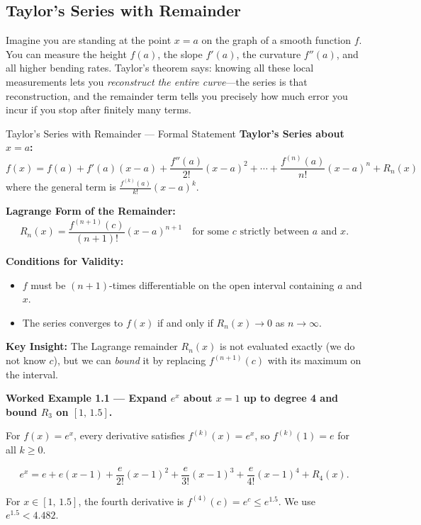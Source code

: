 \documentclass[12pt,a4paper]{article}
\begin{document}
\subsection{Taylor's Series with Remainder}

Imagine you are standing at the point \(x = a\) on the graph of a smooth function \(f\).
You can measure the height \(f(a)\), the slope \(f'(a)\), the curvature \(f''(a)\), and
all higher bending rates.
Taylor's theorem says: knowing all these local measurements lets you \emph{reconstruct the
entire curve}---the series is that reconstruction, and the remainder term tells you precisely
how much error you incur if you stop after finitely many terms.

\begin{infobox}{Taylor's Series with Remainder --- Formal Statement}
\textbf{Taylor's Series about \(x = a\):}
\[
  f(x) = f(a) + f'(a)(x-a) + \frac{f''(a)}{2!}(x-a)^2 + \cdots
         + \frac{f^{(n)}(a)}{n!}(x-a)^n + R_n(x)
\]
where the general term is \(\displaystyle\frac{f^{(k)}(a)}{k!}(x-a)^k\).

\medskip
\textbf{Lagrange Form of the Remainder:}
\[
  R_n(x) = \frac{f^{(n+1)}(c)}{(n+1)!}(x-a)^{n+1}
  \quad \text{for some } c \text{ strictly between } a \text{ and } x.
\]

\medskip
\textbf{Conditions for Validity:}
\begin{itemize}[leftmargin=1.5em]
  \item \(f\) must be \((n+1)\)-times differentiable on the open interval containing \(a\) and \(x\).
  \item The series converges to \(f(x)\) if and only if \(R_n(x) \to 0\) as \(n \to \infty\).
\end{itemize}

\medskip
\textbf{Key Insight:} The Lagrange remainder \(R_n(x)\) is not evaluated exactly (we do not know
\(c\)), but we can \emph{bound} it by replacing \(f^{(n+1)}(c)\) with its maximum on the interval.
\end{infobox}

\textbf{Worked Example 1.1 --- Expand \(e^x\) about \(x=1\) up to degree 4 and bound \(R_3\) on
\([1,\,1.5]\).}

\medskip
For \(f(x) = e^x\), every derivative satisfies \(f^{(k)}(x) = e^x\), so
\(f^{(k)}(1) = e\) for all \(k \geq 0\).

\[
  e^x = e + e(x-1) + \frac{e}{2!}(x-1)^2 + \frac{e}{3!}(x-1)^3
        + \frac{e}{4!}(x-1)^4 + R_4(x).
\]

For \(x \in [1,\,1.5]\), the fourth derivative is \(f^{(4)}(c)= e^c \leq e^{1.5}\).
We use \(e^{1.5} < 4.482\).
\end{document}
